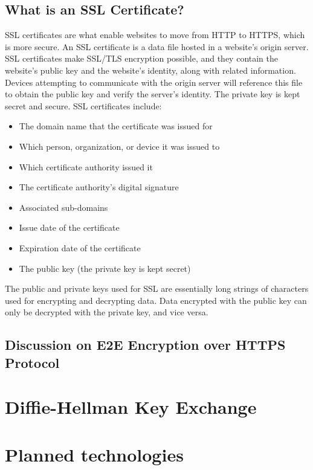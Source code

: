 \subsection{What is an SSL Certificate?}\label{subsec:what-is-an-ssl-certificate?}
SSL certificates are what enable websites to move from HTTP to HTTPS, which is more secure.
An SSL certificate is a data file hosted in a website's origin server.
SSL certificates make SSL/TLS encryption possible, and they contain the website's public key and the website's identity,
along with related information.
Devices attempting to communicate with the origin server will reference this file to obtain the public key and verify
the server's identity.
The private key is kept secret and secure.
SSL certificates include:
\begin{itemize}
    \item The domain name that the certificate was issued for
    \item Which person, organization, or device it was issued to
    \item Which certificate authority issued it
    \item The certificate authority's digital signature
    \item Associated sub-domains
    \item Issue date of the certificate
    \item Expiration date of the certificate
    \item The public key (the private key is kept secret)
\end{itemize}
The public and private keys used for SSL are essentially long strings of characters used for encrypting and decrypting data.
Data encrypted with the public key can only be decrypted with the private key, and vice versa.

\subsection{Discussion on E2E Encryption over HTTPS Protocol}\label{subsec:discussion-on-e2e-encryption-over-https-protocol}


\section{Diffie-Hellman Key Exchange}\label{sec:diffie-hellman-key-exchange}



\section{Planned technologies}\label{sec:planned-technologies}
